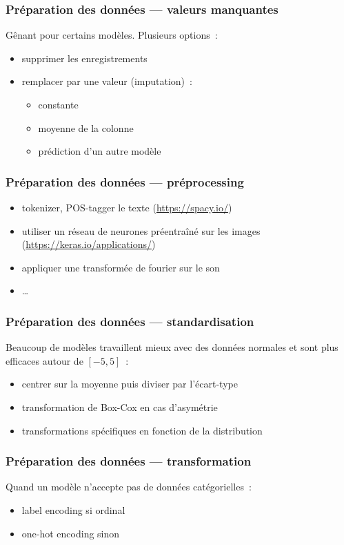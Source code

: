 \documentclass{formation}
\begin{document}
\begin{frame}
  \frametitle{Préparation des données — valeurs manquantes}
  Gênant pour certains modèles. Plusieurs options :
  \begin{itemize}[<+->]
  \item supprimer les enregistrements
  \item remplacer par une valeur (imputation) :
    \begin{itemize}[<+->]
    \item constante
    \item moyenne de la colonne
    \item prédiction d'un autre modèle
    \end{itemize}
  \end{itemize}
\end{frame}

\begin{frame}
  \frametitle{Préparation des données — préprocessing}
  \begin{itemize}
  \item tokenizer, POS-tagger le texte (\url{https://spacy.io/})
  \item utiliser un réseau de neurones préentraîné sur les images
    (\url{https://keras.io/applications/})
  \item appliquer une transformée de fourier sur le son
  \item …
  \end{itemize}
\end{frame}

\begin{frame}
  \frametitle{Préparation des données — standardisation}
  Beaucoup de modèles travaillent mieux avec des données normales et
  sont plus efficaces autour de $[-5, 5]$ :
  \begin{itemize}
  \item centrer sur la moyenne puis diviser par l'écart-type
  \item transformation de Box-Cox en cas d'asymétrie
  \item transformations spécifiques en fonction de la distribution
  \end{itemize}
\end{frame}

\begin{frame}
  \frametitle{Préparation des données — transformation}
  Quand un modèle n'accepte pas de données catégorielles :
  \begin{itemize}
  \item label encoding si ordinal
  \item one-hot encoding sinon
  \end{itemize}
\end{frame}
\end{document}
